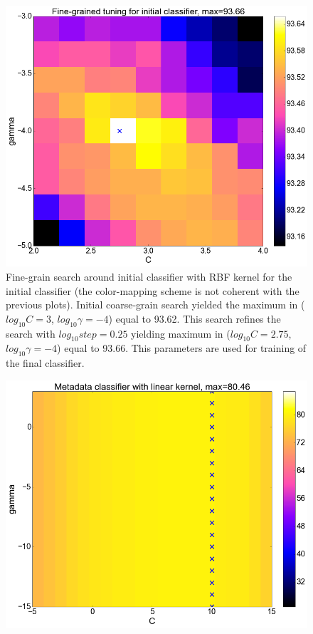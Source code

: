 \begin{center}
\begin{figure}
  \label{fig:initial_sigmoid}
\end{figure}
\begin{figure}
	\centering
  \includegraphics[width=\textwidth]{plots/init_fine}
  \caption{Fine-grain search around initial classifier with RBF kernel for the initial classifier (the color-mapping scheme is not coherent with the previous plots). Initial coarse-grain search yielded the maximum in ($log_{10}C=3$, $log_{10}\gamma=-4$) equal to 93.62. This search refines the search with $log_{10}step=0.25$ yielding maximum in ($log_{10}C=2.75$, $log_{10}\gamma=-4$) equal to 93.66. This parameters are used for training of the final classifier.}
  \label{fig:initial_fine}
\end{figure}
\begin{figure}
	\centering
  \includegraphics[width=\textwidth]{plots/meta_linear}

\end{figure}
\end{center}
